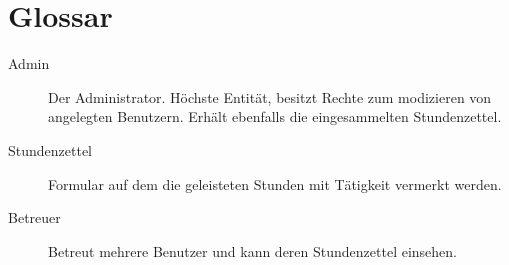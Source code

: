 \section{Glossar}
\begin{description}
	\item[Admin] Der Administrator. Höchste Entität, besitzt Rechte zum modizieren von angelegten Benutzern.
	               Erhält ebenfalls die eingesammelten Stundenzettel.

	\item[Stundenzettel] Formular auf dem die geleisteten Stunden mit Tätigkeit vermerkt werden.

	\item[Betreuer] Betreut mehrere Benutzer und kann deren Stundenzettel einsehen.
\end{description}
